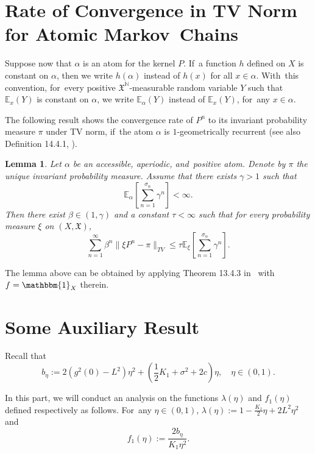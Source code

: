 \documentclass[11pt]{elsarticle}
\newtheorem{lemma}{Lemma}[section]
\def\leq{\leqslant}
\def\E{\mathbb{E}}
\def\N{\mathbb{N}}
\begin{document}
\section{Rate of Convergence in TV Norm for Atomic Markov~Chains}\label{sec5-2}
Suppose now that $\alpha$ is an atom for the kernel $P$. If~a function $h$ defined on $X$ is constant on $\alpha$, then we write $h(\alpha)$ instead of $h(x)$ for all $x\in\alpha$. With~this convention, for~every positive $\mathfrak{X}^{\N}$-measurable random variable $Y$ such that $\E_x(Y)$ is constant on $\alpha$, we write $\E_{\alpha}(Y)$ instead of $\E_{x}(Y)$, for~any $x\in\alpha$.

The following result shows the convergence rate of $P^n$ to its invariant probability measure $\pi$ under TV norm, if~the atom $\alpha$ is $1$-geometrically recurrent (see also {Definition 14.4.1}, \cite{DMPS18}).
\begin{lemma}\label{Thm13.4.3app2} Let $\alpha$ be an accessible, aperiodic, and~positive atom. Denote by $\pi$ the unique invariant probability measure. Assume that there exists $\gamma > 1$ such that
	$$
	\E_\alpha\left[\sum_{n=1}^{\sigma_\alpha}\gamma^n\right]<\infty.
	$$
Then there exist $\beta\in(1,\gamma)$ and a constant $\tau<\infty$ such that for every probability measure $\xi$ on $(X,\mathfrak{X})$,
	$$\sum_{n=1}^\infty\beta^n\|\xi P^n-\pi\|_{TV}\leq\tau\E_\xi\left[\sum_{n=1}^{\sigma_\alpha}\gamma^n\right].$$
\end{lemma}
The lemma above can be obtained by applying {Theorem 13.4.3} in~\cite{DMPS18} with $f=\mathbbm{1}_X$ therein.

\section{Some Auxiliary Result}\label{sec5-3}
Recall that
\begin{equation}\label{Def2-b}
	b_{\eta}:=2\left(g^2(0)-L^2\right)\eta^2+\left(\frac{1}{2}K_1+\sigma^2+2c\right)\eta,\quad \eta\in(0,1).
\end{equation}

In this part, we will conduct an analysis on the functions $\lambda(\eta)$ and $f_1(\eta)$ defined respectively as follows. For~any $\eta\in(0,1)$, $\lambda(\eta):=1-\frac{K_1}{2}\eta+2L^2\eta^2$ and
\begin{equation}\label{Def-f1}
	f_1(\eta):=\frac{2b_\eta}{K_1\eta^2}.
\end{equation}
\end{document}
